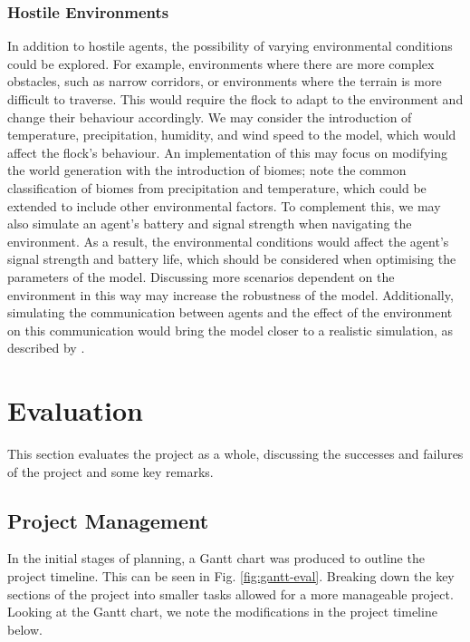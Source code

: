\documentclass[12pt]{article}
\begin{document}
\subsubsection{Hostile Environments}
In addition to hostile agents, the possibility of varying environmental conditions could be explored. For example, environments where there are more complex obstacles, such as narrow corridors, or environments where the terrain is more difficult to traverse. This would require the flock to adapt to the environment and change their behaviour accordingly. We may consider the introduction of temperature, precipitation, humidity, and wind speed to the model, which would affect the flock's behaviour.  An implementation of this may focus on modifying the world generation with the introduction of biomes; \citet{jiang2017biome,whittaker1970communities} note the common classification of biomes from precipitation and temperature, which could be extended to include other environmental factors. To complement this, we may also simulate an agent's battery and signal strength when navigating the environment. As a result, the environmental conditions would affect the agent's signal strength and battery life, which should be considered when optimising the parameters of the model. Discussing more scenarios dependent on the environment in this way may increase the robustness of the model. Additionally, simulating the communication between agents and the effect of the environment on this communication would bring the model closer to a realistic simulation, as described by \citet{Zhou}.

\section{Evaluation}
This section evaluates the project as a whole, discussing the successes and failures of the project and some key remarks.

\subsection{Project Management}
In the initial stages of planning, a Gantt chart was produced to outline the project timeline. This can be seen in Fig. \ref{fig:gantt-eval}. Breaking down the key sections of the project into smaller tasks allowed for a more manageable project. Looking at the Gantt chart, we note the modifications in the project timeline below.
\end{document}
